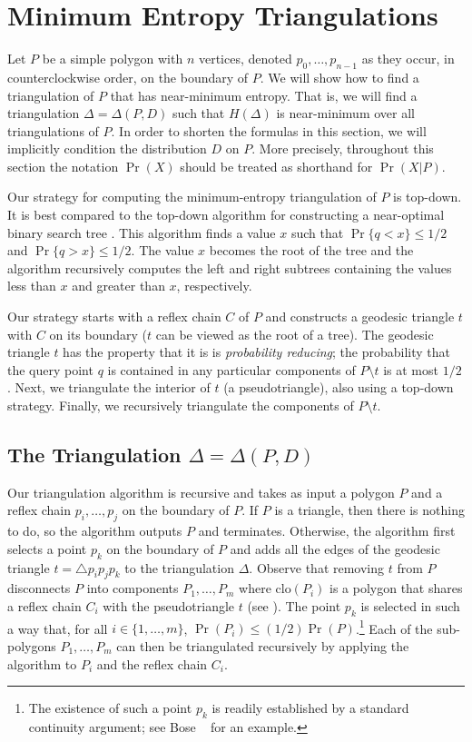 \documentclass[lotsofwhite]{patmorin}
\newcommand{\closure}{\mathrm{clo}}
\begin{document}
\section{Minimum Entropy Triangulations} 

Let $P$ be a simple polygon with $n$ vertices, denoted
$p_0,\ldots,p_{n-1}$ as they occur, in counterclockwise order, on the
boundary of $P$.  We will show how to find a triangulation of $P$ that
has near-minimum entropy.  That is, we will find a triangulation
$\Delta=\Delta(P,D)$ such that $H(\Delta)$ is near-minimum over all
triangulations of $P$.  In order to shorten the formulas in this
section, we will implicitly condition the distribution $D$ on $P$.
More precisely, throughout this section the notation $\Pr(X)$ should
be treated as shorthand for $\Pr(X|P)$.

Our strategy for computing the minimum-entropy triangulation of $P$ is
top-down.  It is best compared to the top-down algorithm for constructing
a near-optimal binary search tree \cite{m75}. This algorithm finds a
value $x$ such that $\Pr\{q < x\} \le 1/2$ and $\Pr\{q > x\}\le 1/2$.
The value $x$ becomes the root of the tree and the algorithm recursively
computes the left and right subtrees containing the values less than $x$
and greater than $x$, respectively.

Our strategy starts with a reflex chain $C$ of $P$ and constructs a
geodesic triangle $t$ with $C$ on its boundary ($t$ can be viewed as the
root of a tree).  The geodesic triangle $t$ has the property that it is
is \emph{probability reducing}; the probability that the query point $q$
is contained in any particular components of $P\setminus t$ is at most
$1/2$.  Next, we triangulate the interior of $t$ (a pseudotriangle),
also using a top-down strategy.  Finally, we recursively triangulate
the components of $P\setminus t$.

\subsection{The Triangulation $\Delta=\Delta(P,D)$}

Our triangulation algorithm is recursive and takes as input a polygon
$P$ and a reflex chain $p_i,\ldots,p_j$ on the boundary of $P$.  If
$P$ is a triangle, then there is nothing to do, so the algorithm
outputs $P$ and terminates. Otherwise, the
algorithm first selects a point $p_k$ on the boundary of $P$ and adds
all the edges of the geodesic triangle $t=\triangle p_ip_jp_k$ to the
triangulation $\Delta$.
Observe that removing $t$ from $P$ disconnects $P$ into
components $P_1,\ldots,P_m$ where $\closure(P_i)$ is a polygon that shares a
reflex chain $C_i$ with the pseudotriangle $t$ (see
).  The point
$p_k$ is selected in such a way that, for all $i\in\{1,\ldots,m\}$, $\Pr(P_i)
\le (1/2)\Pr(P)$.\footnote{The existence of such a point $p_k$ is
readily established by a standard continuity argument; see Bose \etal\
\cite{bdhlim07} for an example.} Each of the sub-polygons $P_1,\ldots,P_m$
can then be triangulated recursively by applying the algorithm to
$P_i$ and the reflex chain $C_i$.
\end{document}
